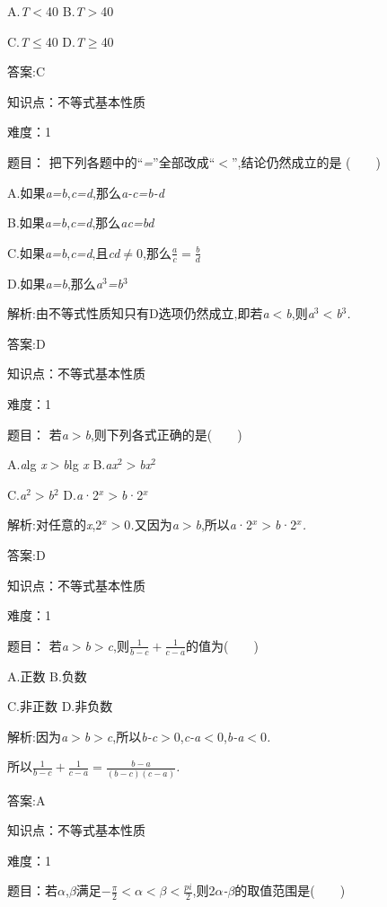 \documentclass{article} %
\begin{document}
 A.\textit{T$<$}40 B.\textit{T$>$}40

 C.\textit{T}$\mathrm{\le}$40 D.\textit{T}$\mathrm{\ge}$40

 答案:C


知识点：不等式基本性质

难度：1

题目：
把下列各题中的``\textit{=}''全部改成``\textit{$<$}'',结论仍然成立的是 (\textit{　　})

 A.如果\textit{a=b},\textit{c=d},那么\textit{a-c=b-d}

 B.如果\textit{a=b},\textit{c=d},那么\textit{ac=bd}

 C.如果\textit{a=b},\textit{c=d},且\textit{cd}$\mathrm{\neq}$0,那么\textit{$\frac{a}{c} = \frac{b}{d}$}

 D.如果\textit{a=b},那么\textit{a}${}^{3}$\textit{=b}${}^{3}$

 解析:由不等式性质知只有D选项仍然成立,即若\textit{a$<$b},则\textit{a}${}^{3}$\textit{$<$b}${}^{3}$\textit{.}

 答案:D

知识点：不等式基本性质

难度：1


 题目：
若\textit{a$>$b},则下列各式正确的是(\textit{　　})

 A.\textit{a}lg \textit{x$>$b}lg \textit{x} B.\textit{ax}${}^{2}$\textit{$>$bx}${}^{2}$

 C.\textit{a}${}^{2}$\textit{$>$b}${}^{2}$ D.\textit{a}·2\textit{${}^{x}$$>$b}·2\textit{${}^{x}$}

 解析:对任意的\textit{x},2\textit{${}^{x}$$>$}0\textit{.}又因为\textit{a$>$b},所以\textit{a}·2\textit{${}^{x}$$>$b}·2\textit{${}^{x}$.}

 答案:D

知识点：不等式基本性质

难度：1

 题目： 若\textit{a$>$b$>$c},则\textit{$\frac{1}{b-c}+\frac{1}{c-a}$}的值为(\textit{　　})

 A.正数 B.负数

 C.非正数 D.非负数

 解析:因为\textit{a$>$b$>$c},所以\textit{b-c$>$}0,\textit{c-a$<$}0,\textit{b-a$<$}0\textit{.}

所以\textit{$\frac{1}{b-c}+\frac{1}{c-a}=\frac{b-a}{(b-c)(c-a)}$}\textit{.}

 答案:A

知识点：不等式基本性质

难度：1

 题目：若\textit{$\alpha$},\textit{$\beta$}满足\textit{$-\frac{\pi}{2}<$$\alpha$$<$$\beta$$<\frac{pi}{2}$},则2\textit{$\alpha$-$\beta$}的取值范围是(\textit{　　})
\end{document}

